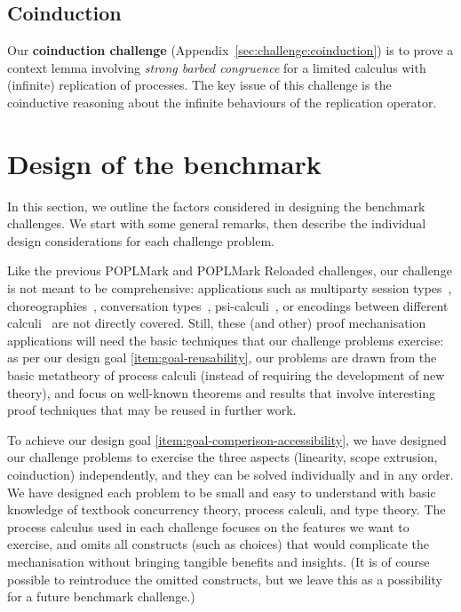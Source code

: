 \documentclass[runningheads]{llncs}
\begin{document}
\subsection{Coinduction}
Our \textbf{coinduction challenge} (Appendix~\ref{sec:challenge:coinduction}) is to prove a context lemma involving \emph{strong barbed congruence} for a limited calculus with (infinite) replication of processes.
The key issue of this challenge is the coinductive reasoning about the infinite behaviours of the replication operator.

\section{Design of the benchmark}\label{sec:design-discussion}

In this section, we outline the factors considered in designing the
benchmark challenges. We start with some general remarks, then
describe the individual design considerations for each challenge problem.

Like the previous POPLMark and POPLMark Reloaded challenges, our challenge is not meant to be comprehensive:
applications such as multiparty session types~\cite{10.1145/2827695,10.1145/3290343}, choreographies~\cite{DBLP:journals/jar/CruzFilipeMP23}, conversation types~\cite{DBLP:journals/tcs/CairesV10}, psi-calculi~\cite{lmcs:696}, or encodings between different calculi~\cite{DBLP:journals/iandc/Gorla10,DBLP:journals/iandc/DardhaGS17,DBLP:conf/ecoop/ScalasDHY17} are not directly covered.  Still, these (and other) proof mechanisation applications will need the basic techniques that our challenge problems exercise:
as per our design goal \ref{item:goal-reusability},
our problems are drawn from the basic metatheory of process calculi (instead
of requiring the development of new theory), and focus on well-known theorems
and results that involve interesting proof techniques that may be reused in further work.

To achieve our design goal \ref{item:goal-comperison-accessibility},
we have designed our challenge problems to exercise the three aspects (linearity, scope extrusion, coinduction) independently, and they can be solved individually and in any order.
We have designed each problem to be small and easy to understand with basic knowledge of textbook concurrency theory, process calculi, and type theory.  The process calculus used in each challenge
focuses on the features we want to exercise, and omits all constructs
(such as choices) that would complicate the mechanisation without bringing tangible
benefits and insights.  (It is of course possible to reintroduce the omitted
constructs, but we leave this as a possibility for a future benchmark challenge.)
\end{document}
